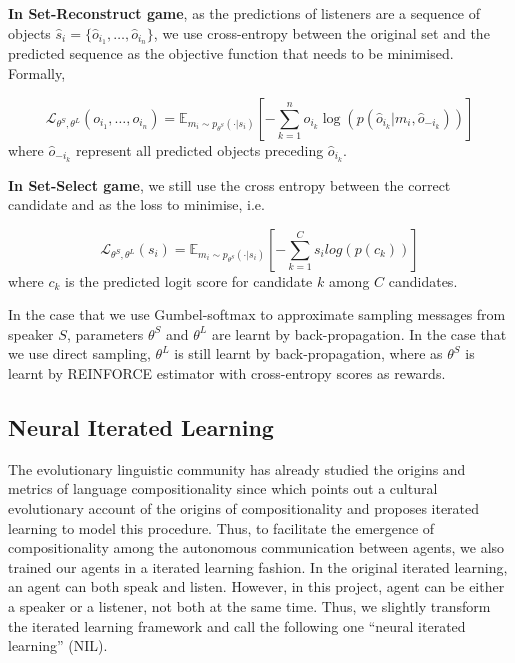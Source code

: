 \textbf{In Set-Reconstruct game}, as the predictions of listeners are a sequence of objects $\hat{s}_i=\{\hat{o}_{i_1}, \dots, \hat{o}_{i_n}\}$, we use cross-entropy between the original set and the predicted sequence as the objective function that needs to be minimised. Formally,

\begin{equation}
  \mathcal{L}_{\theta^S, \theta^L}(o_{i_1}, \dots, o_{i_n}) =\mathbb{E}_{m_i\sim p_{\theta^S}(\cdot|s_i)} \left[ -\sum_{k=1}^{n} o_{i_k} \log(p(\hat{o}_{i_k}|m_i, \hat{o}_{-i_k})) \right]
  \label{eq3.2.3.1:cross_entropy_seq}
\end{equation}
where $\hat{o}_{-i_k}$ represent all predicted objects preceding $\hat{o}_{i_k}$.

\noindent\textbf{In Set-Select game}, we still use the cross entropy between the correct candidate and  as the loss to minimise, i.e.

\begin{equation}
  \mathcal{L}_{\theta^S, \theta^L}(s_i) = \mathbb{E}_{m_i\sim p_{\theta^S}(\cdot|s_i)} \left[-\sum_{k=1}^{C} s_i log(p(c_k)) \right]
  \label{eq3.2.3.2:cross_entropy_choose}
\end{equation}
where $c_k$ is the predicted logit score for candidate $k$ among $C$ candidates.

In the case that we use Gumbel-softmax to approximate sampling messages from speaker $S$, parameters $\theta^S$ and $\theta^L$ are learnt by back-propagation. In the case that we use direct sampling, $\theta^L$ is still learnt by back-propagation, where as $\theta^S$ is learnt by REINFORCE estimator \cite{williams1992simple} with cross-entropy scores as rewards.

\subsection{Neural Iterated Learning}
\label{ssec3.2.4:iterated_learning}

The evolutionary linguistic community has already studied the origins and metrics of language compositionality since \cite{kirby2002emergence} which points out a cultural evolutionary account of the origins of compositionality and proposes iterated learning to model this procedure. Thus, to facilitate the emergence of compositionality among the autonomous communication between agents, we also trained our agents in a iterated learning fashion. In the original iterated learning, an agent can both speak and listen. However, in this project, agent can be either a speaker or a listener, not both at the same time. Thus, we slightly transform the iterated learning framework and call the following one ``neural iterated learning'' (NIL).

